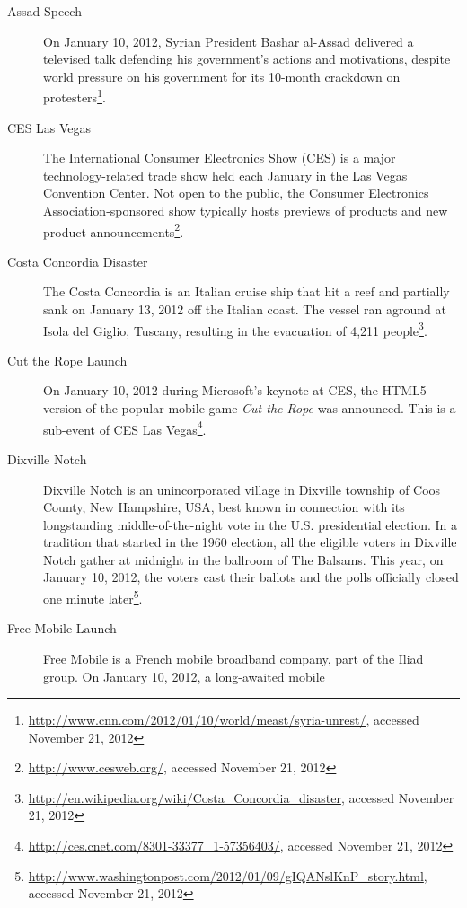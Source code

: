 \begin{description}
  \item[Assad Speech]
       On January 10, 2012, Syrian President Bashar al-Assad
       delivered a televised talk defending his
       government's actions and motivations, despite world
       pressure on his government for its 10-month
       crackdown on
       protesters\footnote{\url{http://www.cnn.com/2012/01/10/world/meast/syria-unrest/},
       accessed November 21, 2012}.
  \item[CES Las Vegas]
       The International Consumer Electronics Show (CES) is
       a major technology-related trade show held each January
       in the Las Vegas Convention Center. Not open to the public,
       the Consumer Electronics Association-sponsored show
       typically hosts previews of products and new product
       announcements\footnote{\url{http://www.cesweb.org/},
       accessed November 21, 2012}.
  \item[Costa Concordia Disaster]
       The Costa Concordia is an Italian cruise ship that hit
       a reef and partially sank on January 13, 2012 off the
       Italian coast. The vessel ran aground at Isola del Giglio,
       Tuscany, resulting in the evacuation of 4,211
       people\footnote{\url{http://en.wikipedia.org/wiki/Costa_Concordia_disaster},
       accessed November 21, 2012}.
  \item[Cut the Rope Launch]
       On January 10, 2012 during Microsoft's keynote at CES, the
       HTML5 version of the popular mobile game \textit{Cut the
       Rope} was announced. This is a sub-event of CES Las
       Vegas\footnote{\url{http://ces.cnet.com/8301-33377_1-57356403/},
       accessed November 21, 2012}.
  \item[Dixville Notch]
       Dixville Notch is an unincorporated village in Dixville
       township of Coos County, New Hampshire, USA, best known in
       connection with its longstanding middle-of-the-night vote in
       the U.S. presidential election. In a tradition that started
       in the 1960 election, all the eligible voters in Dixville
       Notch gather at midnight in the ballroom of The Balsams.
       This year, on January 10, 2012, the voters cast their
       ballots and the polls officially closed one minute
       later\footnote{\url{http://www.washingtonpost.com/2012/01/09/gIQANslKnP_story.html},
       accessed November 21, 2012}.
  \item[Free Mobile Launch]
       Free Mobile is a French mobile broadband company, part of
       the Iliad group. On January 10, 2012, a long-awaited mobile

\end{description}
